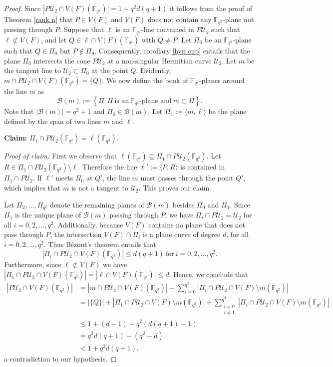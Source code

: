 \documentclass[10pt,a4paper,oneside]{amsproc}
\newcommand{\B}{\mathcal{B}}
\newcommand{\Fqt}{\mathbb{F}_{q^2}}
\newcommand{\U}{\mathcal{U}}
\begin{document}
\begin{proof}
Since $|P\U_2\cap V(F)(\Fqt)|=1+q^2d(q+1)$ it follows from the proof of Theorem \ref{rank n} that $P\in V(F)$ and $V(F)$ does not contain any $\Fqt$-plane not passing through $P$. Suppose that $\ell$ is an $\Fqt$-line contained in $P\U_2$ such that $\ell\not\subset V(F)$, and let $Q\in \ell\cap V(F)(\Fqt)$ with $Q\neq P$. Let $\Pi_0$ be an $\Fqt$-plane such that $Q\in \Pi_0$ but $P\notin \Pi_0$. Consequently, corollary \ref{hyp cup} entails that the plane $\Pi_0$ intersects the cone $P\U_2$ at a non-singular Hermitian curve $\U_2$. Let $m$ be the tangent line to $\U_2\subset \Pi_0$ at the point $Q$. Evidently, $m\cap P\U_2\cap V(F)(\Fqt)=\{Q\}$. We now define the book of $\Fqt$-planes around the line $m$ as $$\B(m):=\left\{\Pi: \Pi \ \text{is an}\ \Fqt\text{-plane and} \ m\subset \Pi  \right\}.$$ Note that $|\B(m)|=q^2+1$ and $\Pi_0\in \B(m)$. Let $\Pi_1:= \langle m,\ell\rangle$ be the plane defined by the span of two lines $m$ and $\ell$. 

\textbf{Claim:} $\Pi_1\cap P\U_2(\Fqt)=\ell(\Fqt)$.

\textit{Proof of claim:} First we observe that $\ell(\Fqt)\subseteq \Pi_1\cap P\U_2(\Fqt)$. Let $R\in \Pi_1\cap P\U_2(\Fqt)\setminus \ell $. Therefore the line $\ell':=\langle P,R\rangle$ is contained in $\Pi_1\cap P\U_2$. If $\ell'$ meets $\Pi_0$ at $Q'$, the line $m$ must passes through the point $Q'$, which implies that $m$ is not a tangent to $\U_2$. This proves our claim.

Let $\Pi_2,\dots,\Pi_{q^2}$ denote the remaining planes of $\mathcal{B}(m)$ besides $\Pi_0$ and $\Pi_1$.
Since $\Pi_1$ is the unique plane of $\B(m)$ passing through $P$, we have $\Pi_i\cap P\U_2=\U_2$ for all $i=0,2,\dots,q^2$. Additionally, because $V(F)$ contains no plane that does not pass through $P$, the intersection $V(F)\cap \Pi_i$ is a plane curve of degree $d$, for all $i=0,2,\dots,q^2$. Thus B\'{e}zout's theorem entails that $$|\Pi_i\cap P\U_2\cap V(F)(\Fqt)|\leq d(q+1) \ \text{for}\ i=0,2,\dots, q^2.$$ Furthermore, since $\ell \not\subset V(F)$ we have $|\Pi_1\cap P\U_2\cap V(F)(\Fqt)|=|\ell\cap V(F)(\Fqt)|\leq d$. Hence, we conclude that 
\begin{align*}
    |P\U_2\cap V(F)(\Fqt)|&= |m\cap P\U_2\cap V(F)(\Fqt)|+\sum_{i=0}^{q^2}|\Pi_i\cap P\U_2\cap V(F)\setminus m (\Fqt)|\\
    &=|\{Q\}|+|\Pi_1\cap P\U_2\cap V(F)\setminus m(\Fqt)|+\sum_{\substack{i=0 \\ i\neq 1}}^{q^2}|\Pi_i\cap P\U_2\cap V(F)\setminus m (\Fqt)| \\
    &\leq 1+(d-1)+q^2\left(d\left(q+1\right)-1\right)\\
    &=q^2d(q+1)-(q^2-d)\\
    &<1+q^2d(q+1),
\end{align*}
a contradiction to our hypothesis.
\end{proof}
\end{document}
